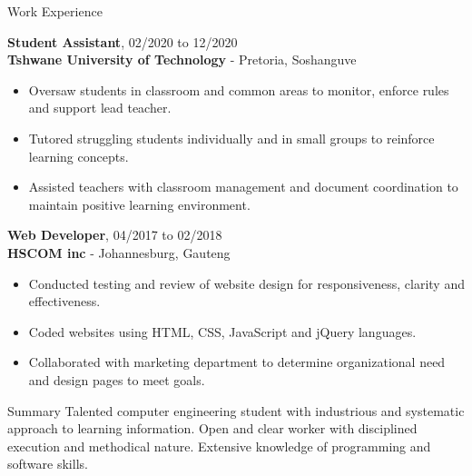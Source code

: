 \documentclass{resume} %
\newcommand{\sepspace}{\vspace*{1em}}           %
\newcommand{\EducationEntry}[4]{
        \noindent \textbf{#1} \hfill \textit{#2} \\     %
        \noindent \textit{#3} \\        %
        \noindent  #4  %
        \normalsize \par}
\begin{document}
\begin{rSection}{Work Experience}

        \textbf{Student Assistant}, 02/2020 to 12/2020 \\
        \textbf{Tshwane University of Technology} - Pretoria, Soshanguve
        \begin{itemize}[noitemsep,topsep=-6pt]
          \item  Oversaw students in classroom and common areas to monitor, enforce rules and support lead teacher.
          \item  Tutored struggling students individually and in small groups to reinforce learning concepts.
          \item  Assisted teachers with classroom management and document coordination to maintain positive learning environment. 
        \end{itemize}

        \sepspace

        \textbf{Web Developer}, 04/2017 to 02/2018 \\
        \textbf{HSCOM inc} - Johannesburg, Gauteng
        \begin{itemize}[noitemsep,topsep=-6pt]
          \item  Conducted testing and review of website design for responsiveness, clarity and effectiveness.
          \item  Coded websites using HTML, CSS, JavaScript and jQuery languages.
          \item  Collaborated with marketing department to determine organizational need and design pages to meet goals.
        \end{itemize}


\end{rSection}

\pagebreak

\begin{rSection}{Summary}
    Talented computer engineering student with industrious and systematic approach to learning information. Open and clear worker with disciplined execution and methodical nature. Extensive knowledge of programming and software skills.
\end{rSection}
\end{document}
